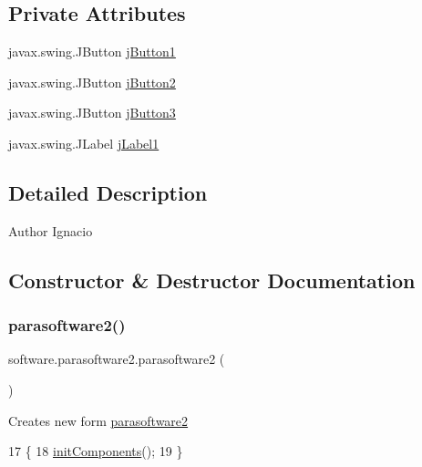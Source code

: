 \subsection*{Private Attributes}
\begin{DoxyCompactItemize}
\item 
javax.\+swing.\+J\+Button \mbox{\hyperlink{classsoftware_1_1parasoftware2_a4378147bbe05c9a06d9a8b7193295dbb}{j\+Button1}}
\item 
javax.\+swing.\+J\+Button \mbox{\hyperlink{classsoftware_1_1parasoftware2_abaa75d46f51c45dbab64b7bb44e560f0}{j\+Button2}}
\item 
javax.\+swing.\+J\+Button \mbox{\hyperlink{classsoftware_1_1parasoftware2_a32aae8d275502c425e0804761777d920}{j\+Button3}}
\item 
javax.\+swing.\+J\+Label \mbox{\hyperlink{classsoftware_1_1parasoftware2_ac0a23aafed6d2dcc193ca1c7cd0c65f7}{j\+Label1}}
\end{DoxyCompactItemize}


\subsection{Detailed Description}
\begin{DoxyAuthor}{Author}
Ignacio 
\end{DoxyAuthor}


\subsection{Constructor \& Destructor Documentation}
\mbox{\label{classsoftware_1_1parasoftware2_aea2b7cefcabec93c2336af7adbc539cd}} 
\subsubsection{\texorpdfstring{parasoftware2()}{parasoftware2()}}
{\footnotesize\ttfamily software.\+parasoftware2.\+parasoftware2 (\begin{DoxyParamCaption}{ }\end{DoxyParamCaption})\hspace{0.3cm}{\ttfamily [inline]}}

Creates new form \mbox{\hyperlink{classsoftware_1_1parasoftware2}{parasoftware2}} 
\begin{DoxyCode}
17                            \{
18         \mbox{\hyperlink{classsoftware_1_1parasoftware2_ac47da7c4445d7d9a884c5099f37bf00a}{initComponents}}();
19     \}
\end{DoxyCode}


